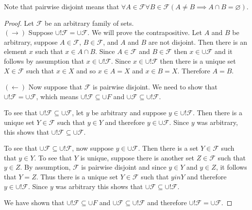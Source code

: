 \documentclass{article}
\newcommand{\F}{\mathcal{F}}
\begin{document}
\begin{flushleft} Note that pairwise disjoint means that $\forall A \in \F \forall B \in \F (A \neq B \implies A \cap B = \varnothing)$.
\end{flushleft}

\begin{proof} Let $\F$ be an arbitrary family of sets. \\
$(\rightarrow)$ Suppose $\cup! \F = \cup \F$. We will prove the contrapositive. Let $A$ and $B$ be arbitrary, suppose $A \in \F$, $B \in \F$, and $A$ and $B$ are not disjoint. Then there is an element $x$ such that $x \in A \cap B$. Since $A \in \F$ and $B \in \F$ then $x \in \cup \F$ and it follows by assumption that $x \in \cup! \F$. Since $x \in \cup! \F$ then there is a unique set $X \in \F$ such that $x \in X$ and so $x \in A = X$ and $x \in B = X$. Therefore $A = B$.

$(\leftarrow)$ Now suppose that $\F$ is pairwise disjoint. We need to show that $\cup! \F = \cup \F$, which means $\cup! \F \subseteq \cup F$ and $\cup \F \subseteq \cup ! \F$. 

To see that $\cup! \F \subseteq \cup \F$, let $y$ be arbitrary and suppose $y \in \cup! \F$. Then there is a unique set $Y \in \F$ such that $y \in Y$ and therefore $y \in \cup \F$. Since $y$ was arbitrary, this shows that $\cup! \F \subseteq \cup \F$.

To see that $\cup \F \subseteq \cup! \F$, now suppose $y \in \cup \F$. Then there is a set $Y \in \F$ such that $y \in Y$. To see that $Y$ is unique, suppose there is another set $Z \in \F$ such that $y \in Z$. By assumption, $\F$ is pairwise disjoint and since $y \in Y$ and $y \in Z$, it follows that $Y = Z$. Thus there is a unique set $Y \in \F$ such that $y in Y$ and therefore $y \in \cup! \F$. Since $y$ was arbitrary this shows that $\cup \F \subseteq \cup! \F$.

We have shown that $\cup! \F \subseteq \cup F$ and $\cup \F \subseteq \cup ! \F$ and therefore $\cup! \F = \cup \F$.
\end{proof}
\end{document}

